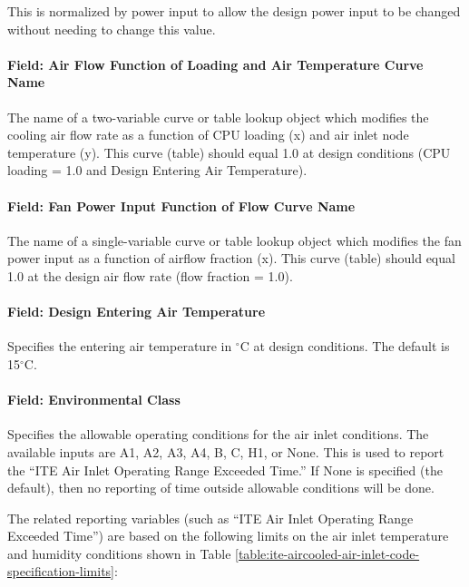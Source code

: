 This is normalized by power input to allow the design power input to be changed without needing to change this value.

\paragraph{Field: Air Flow Function of Loading and Air Temperature Curve Name}\label{field-air-flow-function-of-loading-and-air-temperature-curve-name}

The name of a two-variable curve or table lookup object which modifies the cooling air flow rate as a function of CPU loading (x) and air inlet node temperature (y). This curve (table) should equal 1.0 at design conditions (CPU loading = 1.0 and Design Entering Air Temperature).

\paragraph{Field: Fan Power Input Function of Flow Curve Name}\label{field-fan-power-input-function-of-flow-curve-name}

The name of a single-variable curve or table lookup object which modifies the fan power input as a function of airflow fraction (x). This curve (table) should equal 1.0 at the design air flow rate (flow fraction = 1.0).

\paragraph{Field: Design Entering Air Temperature}\label{field-design-entering-air-temperature}

Specifies the entering air temperature in $^\circ$C at design conditions. The default is 15$^\circ$C.

\paragraph{Field: Environmental Class}\label{field-environmental-class}

Specifies the allowable operating conditions for the air inlet conditions. The available inputs are A1, A2, A3, A4, B, C, H1, or None. This is used to report the ``ITE Air Inlet Operating Range Exceeded Time.'' If None is specified (the default), then no reporting of time outside allowable conditions will be done.

The related reporting variables (such as ``ITE Air Inlet Operating Range Exceeded Time'') are based on the following limits on the air inlet temperature and humidity conditions shown in Table \ref{table:ite-aircooled-air-inlet-code-specification-limits}: 

